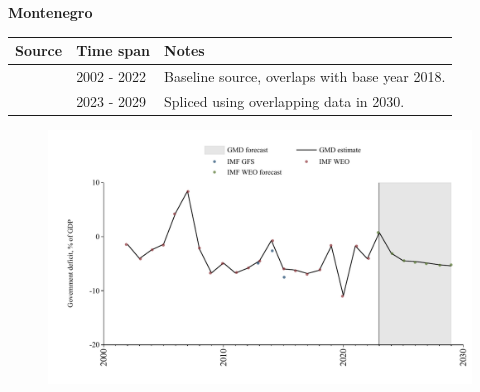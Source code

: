 \documentclass[12pt,a4paper,landscape]{article}
\begin{document}
\begin{adjustbox}{max totalsize={\paperwidth}{\paperheight},center}
\begin{minipage}[t][\textheight][t]{\textwidth}
\vspace*{0.5cm}
{}
\begin{center}
{\Large\bfseries Montenegro}
\end{center}
\vspace{0.5cm}
\begin{table}[H]
\centering
\small
\begin{tabular}{|l|l|l|}
\hline
\textbf{Source} & \textbf{Time span} & \textbf{Notes} \\
\hline
\rowcolor{white}\cite{IMF_WEO}& 2002 - 2022 &Baseline source, overlaps with base year 2018.\\
\rowcolor{lightgray}\cite{IMF_WEO_forecast}& 2023 - 2029 &Spliced using overlapping data in 2030.\\
\hline
\end{tabular}
\end{table}
\begin{figure}[H]
\centering
\includegraphics[width=\textwidth,height=0.6\textheight,keepaspectratio]{graphs/MNE_govdef_GDP.pdf}
\end{figure}
\end{minipage}
\end{adjustbox}
\end{document}
